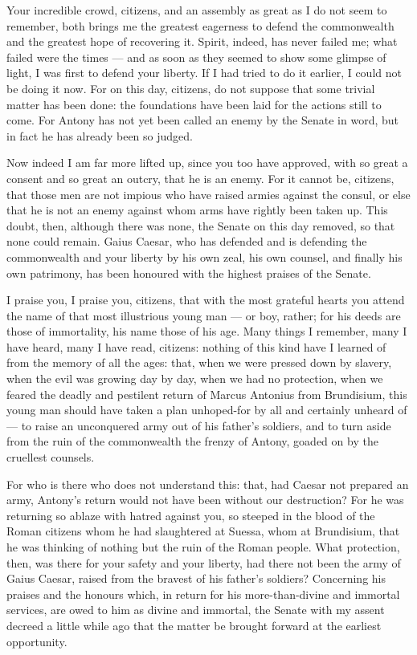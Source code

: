 
 Your incredible crowd, citizens, and an assembly as great as I do not seem to remember, both brings me the greatest eagerness to defend the commonwealth and the greatest hope of recovering it. Spirit, indeed, has never failed me; what failed were the times --- and as soon as they seemed to show some glimpse of light, I was first to defend your liberty. If I had tried to do it earlier, I could not be doing it now. For on this day, citizens, do not suppose that some trivial matter has been done: the foundations have been laid for the actions still to come. For Antony has not yet been called an enemy by the Senate in word, but in fact he has already been so judged.

 Now indeed I am far more lifted up, since you too have approved, with so great a consent and so great an outcry, that he is an enemy. For it cannot be, citizens, that those men are not impious who have raised armies against the consul, or else that he is not an enemy against whom arms have rightly been taken up. This doubt, then, although there was none, the Senate on this day removed, so that none could remain. Gaius Caesar, who has defended and is defending the commonwealth and your liberty by his own zeal, his own counsel, and finally his own patrimony, has been honoured with the highest praises of the Senate.

 I praise you, I praise you, citizens, that with the most grateful hearts you attend the name of that most illustrious young man --- or boy, rather; for his deeds are those of immortality, his name those of his age. Many things I remember, many I have heard, many I have read, citizens: nothing of this kind have I learned of from the memory of all the ages: that, when we were pressed down by slavery, when the evil was growing day by day, when we had no protection, when we feared the deadly and pestilent return of Marcus Antonius from Brundisium, this young man should have taken a plan unhoped-for by all and certainly unheard of --- to raise an unconquered army out of his father's soldiers, and to turn aside from the ruin of the commonwealth the frenzy of Antony, goaded on by the cruellest counsels.

 For who is there who does not understand this: that, had Caesar not prepared an army, Antony's return would not have been without our destruction? For he was returning so ablaze with hatred against you, so steeped in the blood of the Roman citizens whom he had slaughtered at Suessa, whom at Brundisium, that he was thinking of nothing but the ruin of the Roman people. What protection, then, was there for your safety and your liberty, had there not been the army of Gaius Caesar, raised from the bravest of his father's soldiers? Concerning his praises and the honours which, in return for his more-than-divine and immortal services, are owed to him as divine and immortal, the Senate with my assent decreed a little while ago that the matter be brought forward at the earliest opportunity.

